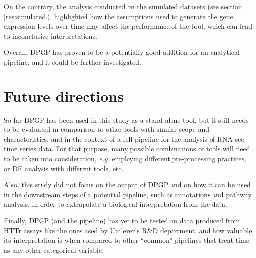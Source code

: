On the contrary, the analysis conducted on the simulated datasets (see section \ref{res:simulated}), highlighted how the assumptions used to generate the gene expression levels over time may affect the performance of the tool, which can lead to inconclusive interpretations.

Overall, DPGP has proven to be a potentially good addition for an analytical pipeline, and it could be further investigated.

\section{Future directions}
So far DPGP has been used in this study as a stand-alone tool, but it still needs to be evaluated in comparison to other tools with similar scope and characteristics, and in the context of a full pipeline for the analysis of RNA-seq time series data.
For that purpose, many possible combinations of tools will need to be taken into consideration, \textit{e.g.} employing different pre-processing practices, or DE analysis with different tools, etc.

Also, this study did not focus on the output of DPGP and on how it can be used in the downstream steps of a potential pipeline, such as annotations and pathway analysis, in order to extrapolate a biological interpretation from the data.

Finally, DPGP (and the pipeline) has yet to be tested on data produced from HTTr assays like the ones used by Unilever's R\&D department, and how valuable its interpretation is when compared to other ``common'' pipelines that treat time as any other categorical variable. 
